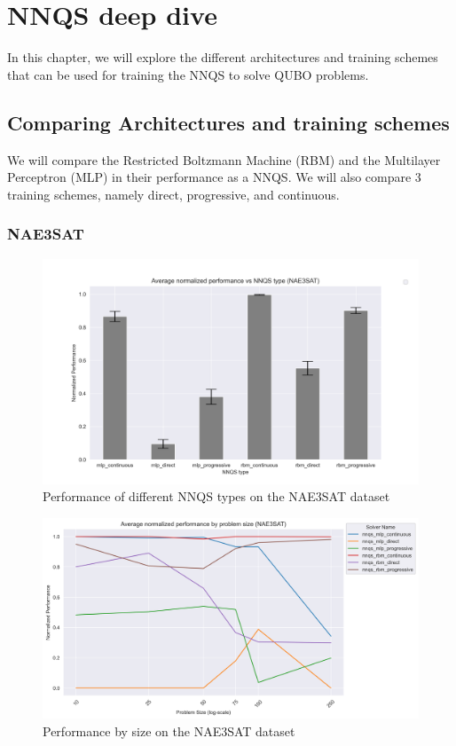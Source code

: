\chapter{NNQS deep dive}\label{nnqsresults}

In this chapter, we will explore the different architectures and training schemes that can be used for training the NNQS to solve QUBO problems.
\section{Comparing Architectures and training schemes}
We will compare the Restricted Boltzmann Machine (RBM) and the Multilayer Perceptron (MLP) in their performance as a NNQS. We will also compare 3 training schemes, namely direct, progressive, and continuous.

\subsection{NAE3SAT}
\begin{figure}[!h]
    \centering
    \includegraphics[width=1\linewidth]{images/nae3sat_nnqs_avg.png}
    \caption{Performance of different NNQS types on the NAE3SAT dataset}
    \label{nnqs-nae3sat-average}
\end{figure}

\begin{figure}[!h]
    \centering
    \includegraphics[width=1\linewidth]{images/nae3sat_nnqs_size.png}
    \caption{Performance by size on the NAE3SAT dataset}
    \label{nnqs-nae3sat-size}
\end{figure}

